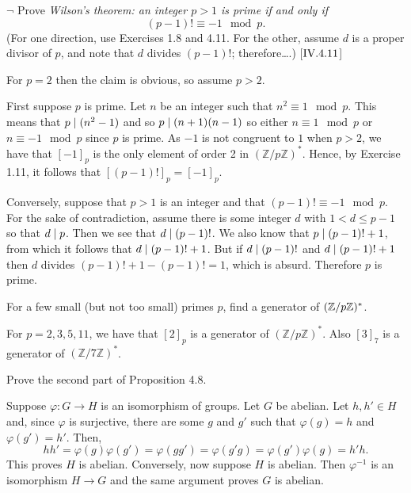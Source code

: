 \begin{exercise}
	$\neg$ Prove \textit{Wilson's theorem: an integer $p>1$ is prime if and only if} 
	\[
		(p-1)! \equiv -1 \mod p.
	\]
	(For one direction, use Exercises 1.8 and 4.11. For the other, assume $d$ is a proper divisor of $p$, and note that $d$ divides $(p-1)!$; therefore\ldots .) [$\RNo{4}.4.11$]
\end{exercise}
\begin{solution}
	For $p = 2$ then the claim is obvious, so assume $p>2$.
	
	First suppose $p$ is prime. Let $n$ be an integer such that $n^2 \equiv 1 \mod p$. This means that $p\mid(n^2 - 1)$ and so $p\mid (n+1)(n-1)$ so either $n\equiv 1\mod p$ or $n\equiv -1 \mod p$ since $p$ is prime. As $-1$ is not congruent to $1$ when $p>2$, we have that $[-1]_p$ is the only element of order 2 in $(\mathbb{Z}/p\mathbb{Z})^*$. Hence, by Exercise 1.11, it follows that $[(p-1)!]_p = [-1]_p$.
	
	Conversely, suppose that $p>1$ is an integer and that $(p-1)! \equiv -1 \mod p$. For the sake of contradiction, assume there is some integer $d$ with $1< d \leq p-1$ so that $d\mid p$. Then we see that $d\mid (p-1)!$. We also know that $p \mid (p-1)! + 1$, from which it follows that $d\mid (p-1)! + 1$. But if $d\mid (p-1)!$ and $d\mid (p-1)! + 1$ then $d$ divides $(p-1)! + 1 - (p-1)! = 1$, which is absurd. Therefore $p$ is prime.
\end{solution}

\begin{exercise}
	For a few small (but not too small) primes $p$, find a generator of $(\mathbb{Z}/p\mathbb{Z})^{*}$.
\end{exercise}
\begin{solution}
	For $p=2,3,5,11$, we have that $[2]_p$ is a generator of $(\mathbb{Z}/p\mathbb{Z})^\ast$. Also $[3]_7$ is a generator of $(\mathbb{Z}/7\mathbb{Z})^\ast$.
\end{solution}

\begin{exercise}
	Prove the second part of Proposition 4.8.
\end{exercise}
\begin{solution}
	Suppose $\varphi \colon G \to H$ is an isomorphism of groups. Let $G$ be abelian. Let $h,h'\in H$ and, since $\varphi$ is surjective, there are some $g$ and $g'$ such that $\varphi(g)  = h$ and $\varphi(g') = h'$. Then,
	\[
		hh' = \varphi(g)\varphi(g') = \varphi(gg') = \varphi(g'g) = \varphi(g')\varphi(g) = h'h.
	\]
	This proves $H$ is abelian. Conversely, now suppose $H$ is abelian. Then $\varphi^{-1}$ is an isomorphism $H \to G$ and the same argument proves $G$ is abelian.
\end{solution}